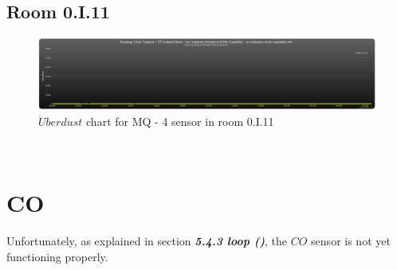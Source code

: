 \documentclass[12pt,a4paper]{report}
\begin{document}
\subsection{Room 0.I.11}
%
\begin{figure}[H]
\centering
	\includegraphics*[width=\textwidth]{ch4_11}
	\caption{$\ddot{U}berdust$ chart for MQ - 4 sensor in room 0.I.11}
	\label{chart_ch4_11}
\end{figure}
\ \\
%
\section{CO}
%
Unfortunately, as explained in section \textit{\textbf{5.4.3 loop ()}}, the $CO$ sensor is not yet functioning properly.
\newpage
%
\end{document}
